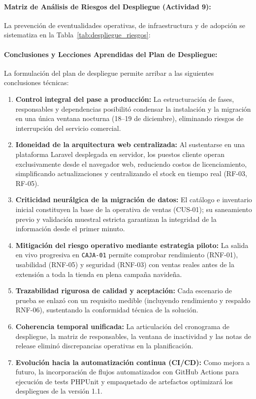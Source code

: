 \documentclass[12pt,a4paper]{article}
\begin{document}
\paragraph{Matriz de Análisis de Riesgos del Despliegue (Actividad 9):}
La prevención de eventualidades operativas, de infraestructura y de adopción se sistematiza en la Tabla~\ref{tab:despliegue_riesgos}:



\paragraph{Conclusiones y Lecciones Aprendidas del Plan de Despliegue:}
La formulación del plan de despliegue permite arribar a las siguientes conclusiones técnicas:
\begin{enumerate}
  \item \textbf{Control integral del pase a producción:} La estructuración de fases, responsables y dependencias posibilitó condensar la instalación y la migración en una única ventana nocturna (18--19 de diciembre), eliminando riesgos de interrupción del servicio comercial.
  \item \textbf{Idoneidad de la arquitectura web centralizada:} Al sustentarse en una plataforma Laravel desplegada en servidor, los puestos cliente operan exclusivamente desde el navegador web, reduciendo costos de licenciamiento, simplificando actualizaciones y centralizando el stock en tiempo real (RF-03, RF-05).
  \item \textbf{Criticidad neurálgica de la migración de datos:} El catálogo e inventario inicial constituyen la base de la operativa de ventas (CUS-01); su saneamiento previo y validación muestral estricta garantizan la integridad de la información desde el primer minuto.
  \item \textbf{Mitigación del riesgo operativo mediante estrategia piloto:} La salida en vivo progresiva en \texttt{CAJA-01} permite comprobar rendimiento (RNF-01), usabilidad (RNF-05) y seguridad (RNF-03) con ventas reales antes de la extensión a toda la tienda en plena campaña navideña.
  \item \textbf{Trazabilidad rigurosa de calidad y aceptación:} Cada escenario de prueba se enlazó con un requisito medible (incluyendo rendimiento y respaldo RNF-06), sustentando la conformidad técnica de la solución.
  \item \textbf{Coherencia temporal unificada:} La articulación del cronograma de despliegue, la matriz de responsables, la ventana de inactividad y las notas de release eliminó discrepancias operativas en la planificación.
  \item \textbf{Evolución hacia la automatización continua (CI/CD):} Como mejora a futuro, la incorporación de flujos automatizados con GitHub Actions para ejecución de tests PHPUnit y empaquetado de artefactos optimizará los despliegues de la versión 1.1.
\end{enumerate}
\end{document}
